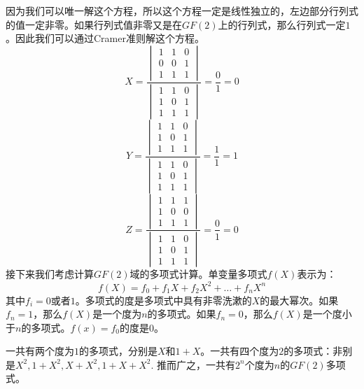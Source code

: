\documentclass[10pt,a4paper,UTF8]{article}
\begin{document}
因为我们可以唯一解这个方程，所以这个方程一定是线性独立的，左边部分行列式的值一定非零。如果行列式值非零又是在\(GF(2)\)上的行列式，那么行列式一定\(1\)。因此我们可以通过Cramer准则解这个方程。
\begin{equation*}
\label{eq:1}
X=
\frac{
\begin{vmatrix}
1& 1& 0 \\
0& 0& 1 \\
1& 1& 1
\end{vmatrix}
}{
\begin{vmatrix}
1& 1& 0 \\
1& 0& 1 \\
1& 1& 1
\end{vmatrix}
}
= \frac{0}{1} = 0
\end{equation*}
\begin{equation*}
Y=
\frac{
\begin{vmatrix}
1& 1& 0 \\
1& 0& 1 \\
1& 1& 1
\end{vmatrix}
}{
\begin{vmatrix}
1& 1& 0 \\
1& 0& 1 \\
1& 1& 1
\end{vmatrix}
}
= \frac{1}{1} = 1
\end{equation*}
\begin{equation*}
Z=
\frac{
\begin{vmatrix}
1& 1& 1 \\
1& 0& 0 \\
1& 1& 1
\end{vmatrix}
}{
\begin{vmatrix}
1& 1& 0 \\
1& 0& 1 \\
1& 1& 1
\end{vmatrix}
}
= \frac{0}{1} = 0
\end{equation*}
接下来我们考虑计算\(GF(2)\)域的多项式计算。单变量多项式\(f(X)\)表示为：
\begin{equation}
\label{eq:3}
f(X) = f_{0} + f_{1}X + f_{2}X^{2} + \ldots + f_{n}X^{n}
\end{equation}
其中\(f_{i}=0\)或者\(1\)。多项式的度是多项式中具有非零洗漱的\(X\)的最大幂次。如果\(f_{n}=1\)，那么\(f(X)\)是一个度为\(n\)的多项式。如果\(f_{n}=0\)，那么\(f(X)\)是一个度小于\(n\)的多项式。\(f(x) = f_{0}\)的度是\(0\)。

一共有两个度为\(1\)的多项式，分别是\(X\)和\(1+X\)。一共有四个度为\(2\)的多项式：非别是\(X^{2},1+X^{2},X+X^{2},1+X+X^{2}\). 推而广之，一共有\(2^{n}\)个度为\(n\)的\(GF(2)\)多项式。
\end{document}
